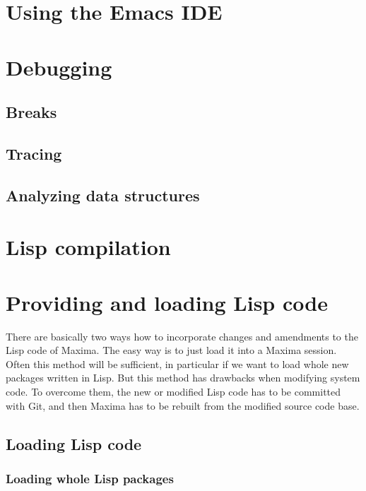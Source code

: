 \documentclass[../Maxima_Workbook.tex]{subfiles}
\begin{document}
\section{Using the Emacs IDE}

\section{Debugging}

\subsection{Breaks}

\subsection{Tracing}

\subsection{Analyzing data structures}

\section{Lisp compilation}

\section{Providing and loading Lisp code}\label{LD1}

There are basically two ways how to incorporate changes and amendments to the Lisp code of Maxima. The easy way is to just load it into a Maxima session. Often this method will be sufficient, in particular if we want to load whole new packages written in Lisp. But this method has drawbacks when modifying system code. To overcome them, the new or modified Lisp code has to be committed with Git, and then Maxima has to be rebuilt from the modified source code base.

\subsection{Loading Lisp code}

\subsubsection{Loading whole Lisp packages}
\end{document}
